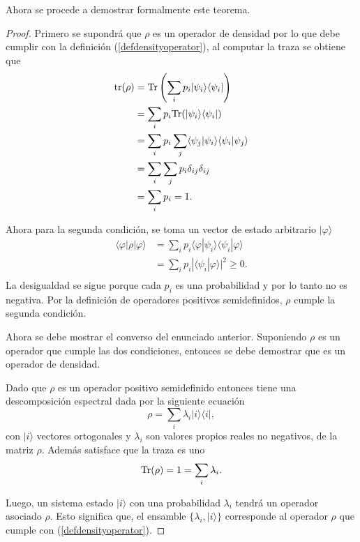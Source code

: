 Ahora se procede a demostrar formalmente este teorema.


\begin{proof}
	Primero se supondrá que $\rho $ es un operador de densidad por lo que debe cumplir con la definición ({\ref{defdensityoperator}}), al computar la traza se obtiene que \begin{equation*}
		\begin{split}
			{\rm tr(\rho)}&={\rm Tr}\left(\sum_{i} p_i|\psi_i\rangle \langle \psi_i|\right) \\
			&=	\sum_{i}p_i {\rm Tr}(|\psi_i\rangle \langle \psi_i|)\\
			&=\sum_{i}p_i \sum_j\langle \psi_j|\psi_i\rangle \langle \psi_i|\psi_j\rangle\\
			&=\sum_{i}\sum_j p_i \delta_{ij} \delta_{ij}\\
			&=\sum_i p_i=1.\\
		\end{split}
	\end{equation*}

Ahora para la segunda condición, se toma un vector de estado arbitrario $|\varphi \rangle$ \begin{equation*}
	\begin{split}
	\langle \varphi |	\rho|\varphi \rangle&=\sum_{i}p_i\langle \varphi |\psi_i\rangle \langle \psi_i|\varphi \rangle \\
	&=\sum_{i}p_i| \langle \psi_i|\varphi \rangle|^2 \ge 0.\\
	\end{split}
\end{equation*}
La desigualdad se sigue porque cada $p_i$ es una probabilidad y por lo tanto no es negativa. Por la definición de operadores positivos semidefinidos, $\rho$ cumple la segunda condición.


Ahora se debe mostrar el converso del enunciado anterior. Suponiendo $\rho$ es un operador que cumple las dos condiciones, entonces se debe demostrar que es un operador de densidad.

Dado que $\rho$ es un operador positivo semidefinido entonces tiene una descomposición espectral dada por la siguiente ecuación {\cite{nielsen_chuang_2010}} \[\rho=\sum_i \lambda_i |i\rangle \langle i|,\] con $|i\rangle$ vectores ortogonales y $\lambda_i$ son valores propios reales no negativos, de la matriz $\rho$. Además satisface que la traza es uno 
\[{\rm Tr}(\rho)=1=\sum_i\lambda_i.\]

Luego, un sistema estado $|i\rangle$ con una probabilidad $\lambda_i$ tendrá un operador asociado $\rho$. Esto significa que, el ensamble $\{\lambda_i, |i\rangle\}$  corresponde al operador $\rho$ que cumple con ({\ref{defdensityoperator}}).


\end{proof}



